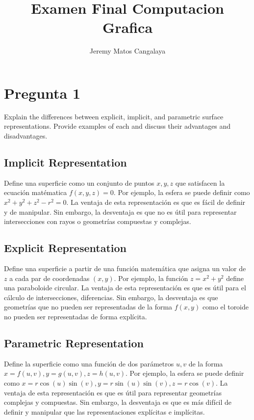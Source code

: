 \documentclass{article}
\title{Examen Final Computacion Grafica}
\author{Jeremy Matos Cangalaya}
\begin{document}
\maketitle

\tableofcontents
\newpage


\section{Pregunta 1}

Explain the differences between explicit, implicit, and parametric surface representations. Provide examples of each and discuss their advantages and disadvantages.

\subsection{Implicit Representation}

Define una superficie como un conjunto de puntos $x, y, z$ que satisfacen la ecuación matématica $f(x, y, z) = 0$. Por ejemplo, la esfera se puede definir como $x^2 + y^2 + z^2 - r^2 = 0$. La ventaja de esta representación es que es fácil de definir y de manipular. Sin embargo, la desventaja es que no es útil para representar intersecciones con rayos o geometrías compuestas y complejas.

\subsection{Explicit Representation}

Define una superficie a partir de una función matemática que asigna un valor de $z$ a cada par de coordenadas $(x, y)$. Por ejemplo, la función $z = x^2 + y^2$ define una paraboloide circular. La ventaja de esta representación es que es útil para el cálculo de intersecciones, diferencias. Sin embargo, la desventaja es que geometrías que no pueden ser representadas de la forma $f(x, y)$ como el toroide no pueden ser representadas de forma explícita.

\subsection{Parametric Representation}

Define la superficie como una función de dos parámetros $u, v$  de la forma $x = f(u, v), y = g(u, v), z = h(u, v)$. Por ejemplo, la esfera se puede definir como $x = r \cos(u) \sin(v), y = r \sin(u) \sin(v), z = r \cos(v)$. La ventaja de esta representación es que es útil para representar geometrías complejas y compuestas. Sin embargo, la desventaja es que es más difícil de definir y manipular que las representaciones explícitas e implícitas.
\end{document}
